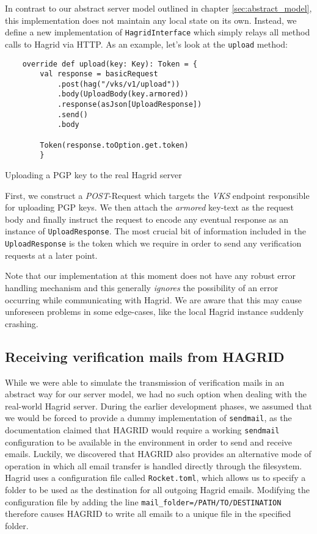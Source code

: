 In contrast to our abstract server model outlined in chapter \ref{sec:abstract_model}, this implementation does not maintain any local state on its own. Instead, we define a new implementation of \texttt{HagridInterface} which simply relays all method calls to Hagrid via HTTP. As an example, let's look at the \texttt{upload} method: 
\begin{code}
    \begin{verbatim}
    override def upload(key: Key): Token = {
        val response = basicRequest
            .post(hag("/vks/v1/upload"))
            .body(UploadBody(key.armored))
            .response(asJson[UploadResponse])
            .send()
            .body
    
        Token(response.toOption.get.token)
        }
    \end{verbatim}
    \caption{Uploading a PGP key to the real Hagrid server}
\end{code}
\label{code:hagrid_upload}
First, we construct a \emph{POST}-Request which targets the \emph{VKS} endpoint responsible for uploading PGP keys. We then attach the \emph{armored} key-text as the request body and finally instruct the request to encode any eventual response as an instance of \texttt{UploadResponse}.
The most crucial bit of information included in the \texttt{UploadResponse} is the token which we require in order to send any verification requests at a later point.

Note that our implementation at this moment does not have any robust error handling mechanism and this generally \emph{ignores} the possibility of an error occurring while communicating with Hagrid. We are aware that this may cause unforeseen problems in some edge-cases, like the local Hagrid instance suddenly crashing.

\subsection{Receiving verification mails from HAGRID}
While we were able to simulate the transmission of verification mails in an abstract way for our server model, we had no such option when dealing with the real-world Hagrid server. During the  earlier development phases, we assumed that we would be forced to provide a dummy implementation of \texttt{sendmail}, as the documentation claimed that HAGRID would require a working \texttt{sendmail} configuration to be available in the environment in order to send and receive emails.
Luckily, we discovered that HAGRID also provides an alternative mode of operation in which all email transfer is handled directly through the filesystem.
Hagrid uses a configuration file called \texttt{Rocket.toml}, which allows us to specify a folder to be used as the destination for all outgoing Hagrid emails.   
Modifying the configuration file by adding the line \texttt{mail_folder=/PATH/TO/DESTINATION} therefore causes HAGRID to write all emails to a unique file in the specified folder.

